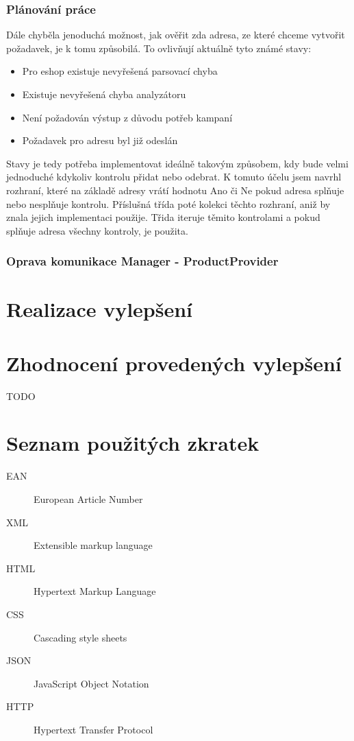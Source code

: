 \documentclass[thesis=B,czech]{FITthesis}[2012/06/26]
\begin{document}
\subsection{Plánování práce}
Dále chyběla jenoduchá možnost, jak ověřit zda adresa, ze které chceme vytvořit
požadavek, je k tomu způsobilá. To ovlivňují aktuálně tyto známé stavy:

\begin{itemize}
\item Pro eshop existuje nevyřešená parsovací chyba
\item Existuje nevyřešená chyba analyzátoru
\item Není požadován výstup z důvodu potřeb kampaní
\item Požadavek pro adresu byl již odeslán
\end{itemize}

Stavy je tedy potřeba implementovat ideálně takovým způsobem, kdy bude velmi jednoduché 
kdykoliv kontrolu přidat nebo odebrat. K tomuto účelu jsem navrhl rozhraní, které na základě adresy 
vrátí hodnotu Ano či Ne pokud adresa splňuje nebo nesplňuje kontrolu. Příslušná třída poté
kolekci těchto rozhraní, aniž by znala jejich implementaci použije. Třida iteruje těmito kontrolami a pokud
splňuje adresa všechny kontroly, je použita.

\subsection{Oprava komunikace Manager - ProductProvider}



\chapter{Realizace vylepšení}

\chapter{Zhodnocení provedených vylepšení}
TODO


\begin{conclusion}
\end{conclusion}





\appendix
\chapter{Seznam použitých zkratek}
\begin{description}
	\item[EAN] European Article Number
	\item[XML] Extensible markup language
	\item[HTML] Hypertext Markup Language
	\item[CSS] Cascading style sheets
	\item[JSON] JavaScript Object Notation
	\item[HTTP] Hypertext Transfer Protocol
\end{description}
\end{document}
